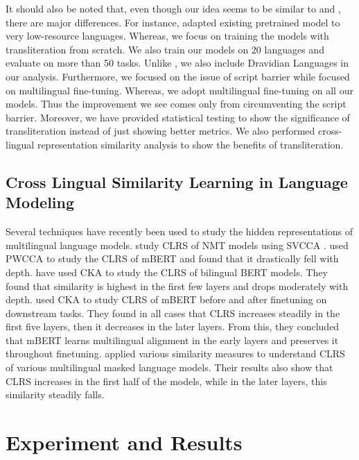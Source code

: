 \documentclass[11pt]{article}
\begin{document}
It should also be noted that, even though our idea seems to be similar to \citet{muller-etal-2021-unseen} and \citet{dhamecha-etal-2021-role}, there are major differences. For instance, \citet{muller-etal-2021-unseen} adapted existing pretrained model to very low-resource languages. Whereas, we focus on training the models with transliteration from scratch. We also train our models on 20 languages and evaluate on more than 50 tasks. Unlike \citet{dhamecha-etal-2021-role}, we also include Dravidian Languages in our analysis. Furthermore, we focused on the issue of script barrier while \citet{dhamecha-etal-2021-role} focused on multilingual fine-tuning. Whereas, we adopt multilingual fine-tuning on all our models. Thus the improvement we see comes only from circumventing the script barrier. Moreover, we have provided statistical testing to show the significance of transliteration instead of just showing better metrics. We also performed cross-lingual representation similarity analysis to show the benefits of transliteration. 

\subsection{Cross Lingual Similarity Learning in Language Modeling}
\label{translit-model}
Several techniques have recently been used to study the hidden representations of multilingual language models. \citet{kudugunta-etal-2019-investigating} study CLRS of NMT models using SVCCA \citep{Raghu2017SVCCASV}. \citet{Singh2019BERTIN} used PWCCA \citep{Morcos2018InsightsOR} to study the CLRS of mBERT and found that it drastically fell with depth. \citep{Wu2020EmergingCS} have used CKA to study the CLRS of bilingual BERT models. They found that similarity is highest in the first few layers and drops moderately with depth. \citet{Muller2021FirstAT} used CKA to study CLRS of mBERT before and after finetuning on downstream tasks. They found in all cases that CLRS increases steadily in the first five layers, then it decreases in the later layers. From this, they concluded that mBERT learns multilingual alignment in the early layers and preserves it throughout finetuning. \citet{Del2021EstablishingII} applied various similarity measures to understand CLRS of various multilingual masked language models. Their results also show that CLRS increases in the first half of the models, while in the later layers, this similarity steadily falls.
\section{Experiment and Results}
\end{document}
